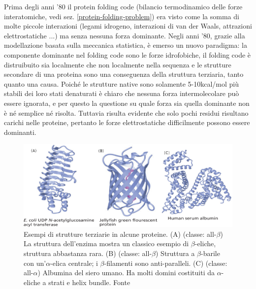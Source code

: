 {{\par Prima degli anni '80 il protein folding code (bilancio termodinamico delle forze interatomiche, vedi sez. \ref{protein-folding-problem}) era visto come la somma di molte piccole interazioni (legami idrogeno, interazioni di van der Waals, attrazioni elettrostatiche ...) ma senza nessuna forza dominante\supercite{dill2008protein}. Negli anni '80, grazie alla modellazione basata sulla meccanica statistica, è emerso un nuovo paradigma: la componente dominante nel folding code sono le forze idrofobiche, il folding code è distruibuito sia localmente che non localmente nella sequenza e le strutture secondare di una proteina sono una conseguenza della struttura terziaria, tanto quanto una causa. Poiché le strutture native sono solamente 5-10kcal/mol più stabili dei loro stati denaturati è chiaro che nessuna forza intermolecolare può essere ignorata, e per questo la questione su quale forza sia quella dominante non è né semplice né risolta. Tuttavia risulta evidente che solo pochi residui risultano carichi nelle proteine, pertanto le forze elettrostatiche difficilmente possono essere dominanti. 

\begin{figure}[!htb]
	\centering
	\includegraphics[scale=0.6]{images/strutture-proteine-complesse.png}
	\caption{Esempi di strutture terziarie in alcune proteine. (A) (classe: all-$\beta$) La struttura dell'enzima mostra un classico esempio di $\beta$-eliche, struttura abbastanza rara. (B) (classe: all-$\beta$) Struttura a $\beta$-barile con un'$\alpha$-elica centrale; i $\beta$-filamenti sono anti-paralleli. (C) (classe: all-$\alpha$)  Albumina del siero umano. Ha molti domini costituiti da $\alpha$-eliche a strati e helix bundle. Fonte \cite{moran2012principles}}
	\label{fig:strutture-complesse}
\end{figure}

}
}
